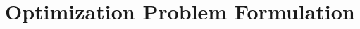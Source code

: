 \documentclass[11pt]{article}
\begin{document}

\section{Optimization Problem Formulation}
\end{document}
